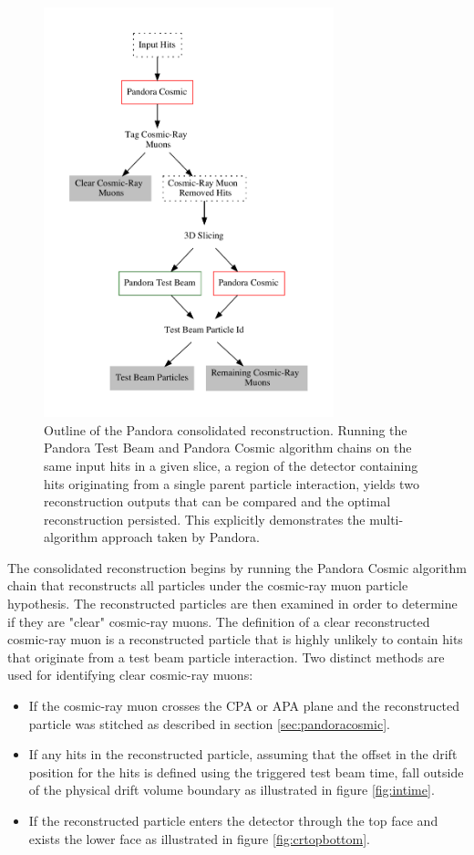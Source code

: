 \begin{figure}
\centering
\includegraphics[width=0.75\textwidth]{Figures/Diagram/ConsolidatedReco.pdf}
\caption{Outline of the Pandora consolidated reconstruction.  Running the Pandora Test Beam and Pandora Cosmic algorithm chains on the same input hits in a given slice, a region of the detector containing hits originating from a single parent particle interaction, yields two reconstruction outputs that can be compared and the optimal reconstruction persisted.  This explicitly demonstrates the multi-algorithm approach taken by Pandora.}
\label{fig:consolidatedreco}
\end{figure}

The consolidated reconstruction begins by running the Pandora Cosmic algorithm chain that reconstructs all particles under the cosmic-ray muon particle hypothesis.  The reconstructed particles are then examined in order to determine if they are "clear" cosmic-ray muons.  The definition of a clear reconstructed cosmic-ray muon is a reconstructed particle that is highly unlikely to contain hits that originate from a test beam particle interaction.  Two distinct methods are used for identifying clear cosmic-ray muons:

\begin{itemize}
\item If the cosmic-ray muon crosses the CPA or APA plane and the reconstructed particle was stitched as described in section \ref{sec:pandoracosmic}.
\item If any hits in the reconstructed particle, assuming that the offset in the drift position for the hits is defined using the triggered test beam time, fall outside of the physical drift volume boundary as illustrated in figure \ref{fig:intime}.
\item If the reconstructed particle enters the detector through the top face and exists the lower face as illustrated in figure \ref{fig:crtopbottom}.
\end{itemize}

